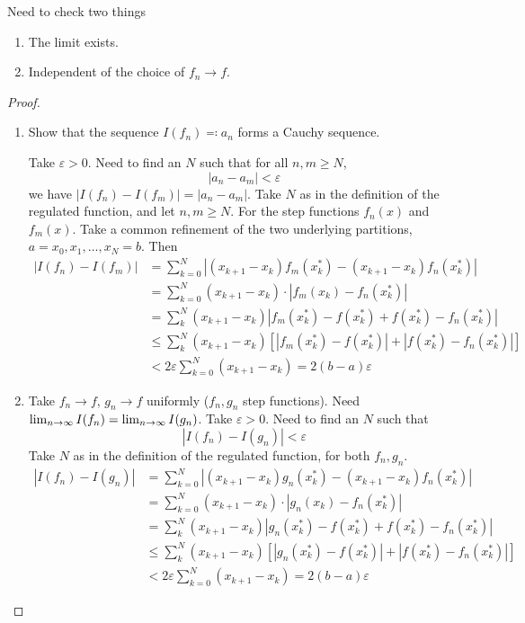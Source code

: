 \documentclass[10pt, a4paper]{article}
\begin{document}
Need to check two things
\begin{enumerate}[label = (\alph*)]
    \item The limit exists.

    \item Independent of the choice of $f_n \to f$.
\end{enumerate}
\begin{proof}
    \begin{enumerate}[label = (\alph*)]
        \item Show that the sequence $I(f_n) \eqqcolon a_n$ forms a Cauchy sequence.

        Take $\varepsilon > 0$.
        Need to find an $N$ such that for all $n, m \geq N$,
        \[
        |a_n - a_m| < \varepsilon
        \]
        we have $|I(f_n) - I(f_m)| = |a_n - a_m|$.
        Take $N$ as in the definition of the regulated function,
        and let $n, m \geq N$.
        For the step functions $f_n(x)$ and $f_m(x)$.
        Take a common refinement of the two underlying partitions,
        $a = x_0, x_1, \dotsc, x_N = b$.
        Then
        \begin{align*}
            |I(f_n) - I(f_m)| &= \sum_{k = 0}^{N}|(x_{k + 1} - x_k)f_m(x_k ^ {*}) - (x_{k + 1} - x_k)f_n(x_k ^ {*})| \\
            &= \sum_{k = 0}^{N}(x_{k + 1} - x_k) \cdot |f_m(x_k) - f_n(x_k ^ {*})| \\
            &= \sum_{k}^{N}(x_{k + 1} - x_k)|f_m(x_k ^ {*}) - f(x_k ^ {*}) + f(x_k ^ {*}) - f_n(x_k ^ {*})| \\
            &\leq \sum_{k}^{N}(x_{k + 1} - x_k)\left[|f_m(x_k ^ {*}) - f(x_k ^ {*})| + |f(x_k ^ {*}) - f_n(x_k ^ {*})|\right] \\
            &< 2\varepsilon\sum_{k = 0}^{N}(x_{k + 1} - x_k) = 2(b - a)\varepsilon
        \end{align*}
    
        \item
        Take $f_n \to f$,
        $g_n \to f$ uniformly
        ($f_n, g_n$ step functions).
        Need $\lim_{n \rightarrow \infty} I(f_n) = \lim_{n \rightarrow \infty} I(g_n)$.
        Take $\varepsilon > 0$.
        Need to find an $N$ such that
        \[
        |I(f_n) - I(g_n)| < \varepsilon
        \]
        Take $N$ as in the definition of the regulated function,
        for both $f_n, g_n$.
        \begin{align*}
            |I(f_n) - I(g_n)| &= \sum_{k = 0}^{N}|(x_{k + 1} - x_k)g_n(x_k ^ {*}) - (x_{k + 1} - x_k)f_n(x_k ^ {*})| \\
            &= \sum_{k = 0}^{N}(x_{k + 1} - x_k) \cdot |g_n(x_k) - f_n(x_k ^ {*})| \\
            &= \sum_{k}^{N}(x_{k + 1} - x_k)|g_n(x_k ^ {*}) - f(x_k ^ {*}) + f(x_k ^ {*}) - f_n(x_k ^ {*})| \\
            &\leq \sum_{k}^{N}(x_{k + 1} - x_k)\left[|g_n(x_k ^ {*}) - f(x_k ^ {*})| + |f(x_k ^ {*}) - f_n(x_k ^ {*})|\right] \\
            &< 2\varepsilon\sum_{k = 0}^{N}(x_{k + 1} - x_k) = 2(b - a)\varepsilon
        \end{align*}
    \end{enumerate}
\end{proof}
\end{document}

